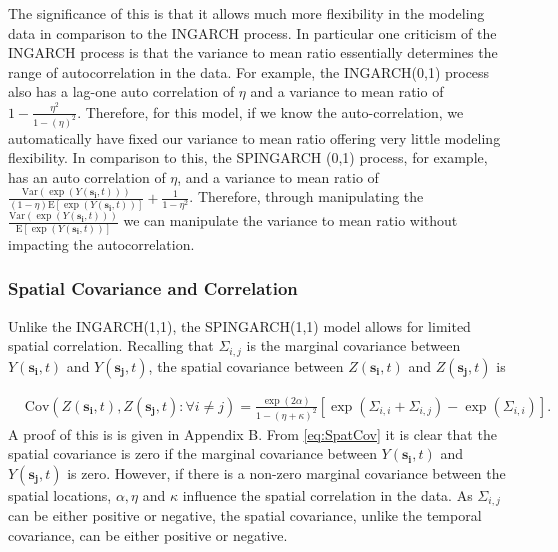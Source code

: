 \documentclass[11pt]{isuthesis}
\begin{document}
The significance of this is that it allows much more flexibility in the modeling data in comparison to the INGARCH process.  In particular one criticism of the INGARCH process is that the variance to mean ratio essentially determines the range of autocorrelation in the data.  For example, the INGARCH(0,1) process also has a lag-one auto correlation of $\eta$ and a variance to mean ratio of $1-\frac{\eta^2}{1-(\eta)^2}$.  Therefore, for this model, if we know the auto-correlation, we automatically have fixed our variance to mean ratio offering very little modeling flexibility.  In comparison to this, the SPINGARCH (0,1) process, for example, has an auto correlation of $\eta$, and a variance to mean ratio of $\frac{\mbox{Var} \left(\exp(Y(\boldsymbol{s_i},t))
	\right)}{(1-\eta) \mbox{E}\left[\exp(Y(\boldsymbol{s_i},t))\right]} + \frac{1}{1-\eta^2}$.  Therefore, through manipulating the $\frac{ \mbox{Var} \left(\exp(Y(\boldsymbol{s_i},t))\right)}{ \mbox{E}\left[\exp(Y(\boldsymbol{s_i},t))\right]}$ we can manipulate the variance to mean ratio without impacting the autocorrelation.




\subsubsection{Spatial Covariance and Correlation}
Unlike the INGARCH(1,1), the SPINGARCH(1,1) model allows for limited spatial correlation.  Recalling that $\Sigma_{i,j}$ is the marginal covariance between $Y(\boldsymbol{s_i},t)$ and $Y(\boldsymbol{s_j},t)$, the spatial covariance between $Z(\boldsymbol{s_i},t)$ and $Z(\boldsymbol{s_j},t)$ is

\begin{align}
	& \mbox{Cov}(Z(\boldsymbol{s_i},t),Z(\boldsymbol{s_j},t):\forall i \neq j) =  \frac{\exp(2\alpha)}{1-(\eta+\kappa)^2}\left[\exp(\Sigma_{i,i}+\Sigma_{i,j}) -\exp(\Sigma_{i,i})\right] \label{eq:SpatCov}.
\end{align}
A proof of this is is given in Appendix B.  From \eqref{eq:SpatCov} it is clear that the spatial covariance is zero if the marginal covariance between $Y(\boldsymbol{s_i},t)$ and $Y(\boldsymbol{s_j},t)$ is zero.  However, if there is a non-zero marginal covariance between the spatial locations, $\alpha,\eta$ and $\kappa$ influence the spatial correlation in the data. As $\Sigma_{i,j}$ can be either positive or negative, the spatial covariance, unlike the temporal covariance, can be either positive or negative.
\end{document}
